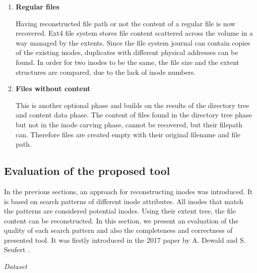 \documentclass{acm_proc_article-sp}
\begin{document}
\begin{enumerate}
\item \textbf{Regular files}

Having reconstructed file path or not the content of a regular file is now recovered. Ext4 file system stores file content scattered across the volume in a way managed by the extents. Since the file system journal can contain copies of the existing inodes, duplicates with different physical addresses can be found. In order for two inodes to be the same, the file size and the extent structures are compared, due to the lack of inode numbers.
\item \textbf{Files without content}

This is another optional phase and builds on the results of the directory tree and content data phase. The content of files found in the directory tree phase but not in the inode carving phase, cannot be recovered, but their filepath can. Therefore files are created empty with their original filename and file path.
\end{enumerate}

\subsection{Evaluation of the proposed tool}

In the previous sections, an approach for reconstructing inodes was introduced. It is based on search patterns of different inode attributes. All inodes that match the patterns are considered potential inodes. Using their extent tree, the file content can be reconstructed. In this section, we present an evaluation of the quality of each search pattern and also the completeness and correctness of presented tool. It was firstly introduced in the 2017 paper by A. Dewald and S. Seufert \cite{afeic}.

\textit{Dataset}
\end{document}
